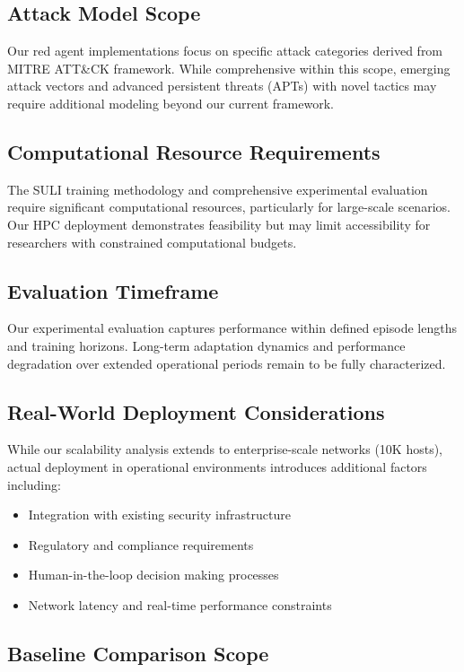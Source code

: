 \documentclass[11pt]{article}
\theoremstyle{definition}
\theoremstyle{plain}
\begin{document}
\subsection{Attack Model Scope}

Our red agent implementations focus on specific attack categories derived from MITRE ATT\&CK framework. While comprehensive within this scope, emerging attack vectors and advanced persistent threats (APTs) with novel tactics may require additional modeling beyond our current framework.

\subsection{Computational Resource Requirements}

The SULI training methodology and comprehensive experimental evaluation require significant computational resources, particularly for large-scale scenarios. Our HPC deployment demonstrates feasibility but may limit accessibility for researchers with constrained computational budgets.

\subsection{Evaluation Timeframe}

Our experimental evaluation captures performance within defined episode lengths and training horizons. Long-term adaptation dynamics and performance degradation over extended operational periods remain to be fully characterized.

\subsection{Real-World Deployment Considerations}

While our scalability analysis extends to enterprise-scale networks (10K hosts), actual deployment in operational environments introduces additional factors including:
\begin{itemize}
\item Integration with existing security infrastructure
\item Regulatory and compliance requirements
\item Human-in-the-loop decision making processes
\item Network latency and real-time performance constraints
\end{itemize}

\subsection{Baseline Comparison Scope}
\end{document}
